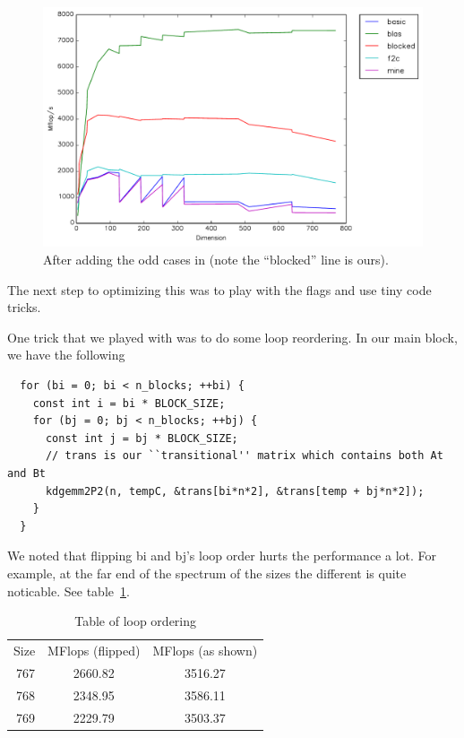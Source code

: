 \documentclass{article}
\begin{document}
  \begin{figure}[h]
    \centering
    \includegraphics[width=.7\textwidth]{odd.pdf}
    \caption{After adding the odd cases in (note the ``blocked'' line is ours).}
    \label{fig:odd}
  \end{figure}

  The next step to optimizing this was to play with the flags and use tiny code tricks.

  One trick that we played with was to do some loop reordering. In our main block, we have the following

  \begin{lstlisting}
  for (bi = 0; bi < n_blocks; ++bi) {
    const int i = bi * BLOCK_SIZE;
    for (bj = 0; bj < n_blocks; ++bj) {
      const int j = bj * BLOCK_SIZE;
      // trans is our ``transitional'' matrix which contains both At and Bt
      kdgemm2P2(n, tempC, &trans[bi*n*2], &trans[temp + bj*n*2]);
    }
  }
\end{lstlisting}

  We noted that flipping bi and bj's loop order hurts the performance a lot. For example, at the far end of the spectrum of the sizes
  the different is quite noticable. See table~\ref{tab:looporder}.

  \begin{table}
    \centering
    \begin{tabular}{r c c}
      Size & MFlops (flipped) & MFlops (as shown) \\
      767  & 2660.82 & 3516.27\\
      768  & 2348.95 & 3586.11\\
      769  & 2229.79 & 3503.37
    \end{tabular}
    \caption{Table of loop ordering}
    \label{tab:looporder}
  \end{table}
\end{document}
